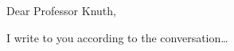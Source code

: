 \documentclass[11pt, english]{UWletterhead}
\begin{document}
\UWheader



Dear Professor Knuth,

I write to you according to the conversation\ldots

\end{document}
